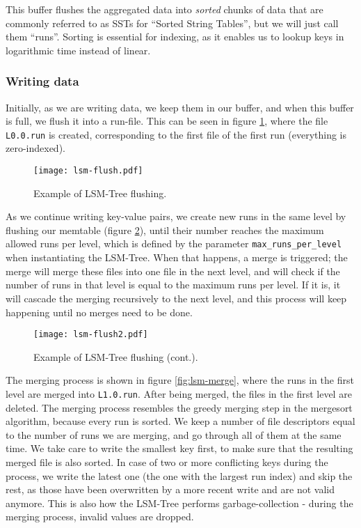 This buffer flushes the aggregated data into \textit{sorted} chunks of data that are commonly referred to as SSTs for ``Sorted String Tables'', but we will just call them ``runs''.
Sorting is essential for indexing, as it enables us to lookup keys in logarithmic time instead of linear.

\subsubsection{Writing data}

Initially, as we are writing data, we keep them in our buffer, and when this buffer is full, we flush it into a run-file. This can be seen in figure \ref{fig:lsm-flush}, where the file \verb"L0.0.run" is created, corresponding to the first file of the first run (everything is zero-indexed).

\vspace{20px}
\begin{figure}[h]
    \centering
    \texttt{[image: lsm-flush.pdf]}
    \caption{Example of LSM-Tree flushing.}
    \label{fig:lsm-flush}
\end{figure}
\vspace{20px}

As we continue writing key-value pairs, we create new runs in the same level by flushing our memtable (figure \ref{fig:lsm-flush2}), until their number reaches the maximum allowed runs per level, which is defined by the parameter \verb"max_runs_per_level" when instantiating the LSM-Tree. When that happens, a merge is triggered; the merge will merge these files into one file in the next level, and will check if the number of runs in that level is equal to the maximum runs per level. If it is, it will cascade the merging recursively to the next level, and this process will keep happening until no merges need to be done.

\vspace{20px}
\begin{figure}[h]
    \centering
    \texttt{[image: lsm-flush2.pdf]}
    \caption{Example of LSM-Tree flushing (cont.).}
    \label{fig:lsm-flush2}
\end{figure}
\vspace{20px}

The merging process is shown in figure \ref{fig:lsm-merge}, where the runs in the first level are merged into \verb"L1.0.run". After being merged, the files in the first level are deleted.
The merging process resembles the greedy merging step in the mergesort algorithm, because every run is sorted. We keep a number of file descriptors equal to the number of runs we are merging, and go through all of them at the same time. We take care to write the smallest key first, to make sure that the resulting merged file is also sorted. In case of two or more conflicting keys during the process, we write the latest one (the one with the largest run index) and skip the rest, as those have been overwritten by a more recent write and are not valid anymore. This is also how the LSM-Tree performs garbage-collection - during the merging process, invalid values are dropped.

